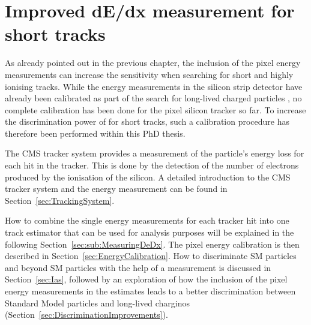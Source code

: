 \FloatBarrier
\chapter{Improved dE/dx measurement for short tracks}
\label{sec:DeDxMeasurement}
As already pointed out in the previous chapter, the inclusion of the pixel energy measurements can increase the sensitivity when searching for short and highly ionising tracks.
While the energy measurements in the silicon strip detector have already been calibrated as part of the search for long-lived charged particles \cite{bib:CMS:HSCP_8TeV}, no complete calibration has been done for the pixel silicon tracker so far.
To increase the discrimination power of \dedx for short tracks, such a calibration procedure has therefore been performed within this PhD thesis.

The CMS tracker system provides a measurement of the particle's energy loss for each hit in the tracker.
This is done by the detection of the number of electrons produced by the ionisation of the silicon.
A detailed introduction to the CMS tracker system and the energy measurement can be found in Section~\ref{sec:TrackingSystem}.

How to combine the single energy measurements for each tracker hit into one track \dedx estimator that can be used for analysis purposes will be explained in the following Section~\ref{sec:sub:MeasuringDeDx}.
The pixel energy calibration is then described in Section~\ref{sec:EnergyCalibration}. 
How to discriminate SM particles and beyond SM particles with the help of a \dedx measurement is discussed in Section~\ref{sec:Ias}, followed by an exploration of how the inclusion of the pixel energy measurements in the \dedx estimates leads to a better discrimination between Standard Model particles and long-lived charginos (Section~\ref{sec:DiscriminationImprovements}).


